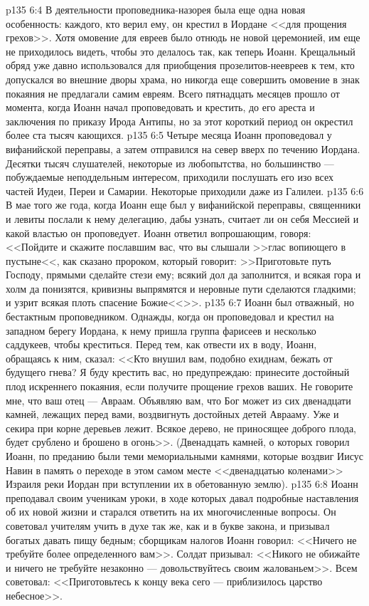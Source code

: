 \vs p135 6:4 В деятельности проповедника\hyp{}назорея была еще одна новая особенность: каждого, кто верил ему, он крестил в Иордане <<для прощения грехов>>. Хотя омовение для евреев было отнюдь не новой церемонией, им еще не приходилось видеть, чтобы это делалось так, как теперь Иоанн. Крещальный обряд уже давно использовался для приобщения прозелитов\hyp{}неевреев к тем, кто допускался во внешние дворы храма, но никогда еще совершить омовение в знак покаяния не предлагали самим евреям. Всего пятнадцать месяцев прошло от момента, когда Иоанн начал проповедовать и крестить, до его ареста и заключения по приказу Ирода Антипы, но за этот короткий период он окрестил более ста тысяч кающихся.
\vs p135 6:5 Четыре месяца Иоанн проповедовал у вифанийской переправы, а затем отправился на север вверх по течению Иордана. Десятки тысяч слушателей, некоторые из любопытства, но большинство --- побуждаемые неподдельным интересом, приходили послушать его изо всех частей Иудеи, Переи и Самарии. Некоторые приходили даже из Галилеи.
\vs p135 6:6 В мае того же года, когда Иоанн еще был у вифанийской переправы, священники и левиты послали к нему делегацию, дабы узнать, считает ли он себя Мессией и какой властью он проповедует. Иоанн ответил вопрошающим, говоря: <<Пойдите и скажите пославшим вас, что вы слышали >>глас вопиющего в пустыне<<, как сказано пророком, который говорит: >>Приготовьте путь Господу, прямыми сделайте стези ему; всякий дол да заполнится, и всякая гора и холм да понизятся, кривизны выпрямятся и неровные пути сделаются гладкими; и узрит всякая плоть спасение Божие<<>>.
\vs p135 6:7 Иоанн был отважный, но бестактным проповедником. Однажды, когда он проповедовал и крестил на западном берегу Иордана, к нему пришла группа фарисеев и несколько саддукеев, чтобы креститься. Перед тем, как отвести их в воду, Иоанн, обращаясь к ним, сказал: <<Кто внушил вам, подобно ехиднам, бежать от будущего гнева? Я буду крестить вас, но предупреждаю: принесите достойный плод искреннего покаяния, если получите прощение грехов ваших. Не говорите мне, что ваш отец --- Авраам. Объявляю вам, что Бог может из сих двенадцати камней, лежащих перед вами, воздвигнуть достойных детей Аврааму. Уже и секира при корне деревьев лежит. Всякое дерево, не приносящее доброго плода, будет срублено и брошено в огонь>>. (Двенадцать камней, о которых говорил Иоанн, по преданию были теми мемориальными камнями, которые воздвиг Иисус Навин в память о переходе в этом самом месте <<двенадцатью коленами>> Израиля реки Иордан при вступлении их в обетованную землю).
\vs p135 6:8 Иоанн преподавал своим ученикам уроки, в ходе которых давал подробные наставления об их новой жизни и старался ответить на их многочисленные вопросы. Он советовал учителям учить в духе так же, как и в букве закона, и призывал богатых давать пищу бедным; сборщикам налогов Иоанн говорил: <<Ничего не требуйте более определенного вам>>. Солдат призывал: <<Никого не обижайте и ничего не требуйте незаконно --- довольствуйтесь своим жалованьем>>. Всем советовал: <<Приготовьтесь к концу века сего --- приблизилось царство небесное>>.
